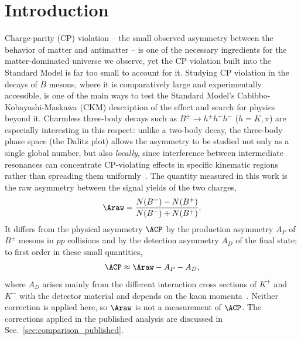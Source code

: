 \section{Introduction}
\label{sec:intro}
Charge-parity (CP) violation -- the small observed asymmetry between the behavior of matter and antimatter -- is one of the necessary ingredients for the matter-dominated universe we observe, yet the CP violation built into the Standard Model is far too small to account for it. Studying CP violation in the decays of $B$ mesons, where it is comparatively large and experimentally accessible, is one of the main ways to test the Standard Model's Cabibbo-Kobayashi-Maskawa (CKM) description of the effect and search for physics beyond it. Charmless three-body decays such as $B^{\pm}\to h^{\pm}h^{+}h^{-}$ ($h=K,\pi$) are especially interesting in this respect: unlike a two-body decay, the three-body phase space (the Dalitz plot) allows the asymmetry to be studied not only as a single global number, but also \emph{locally}, since interference between intermediate resonances can concentrate CP-violating effects in specific kinematic regions rather than spreading them uniformly~\cite{lhcb_cpv_prd2023,lhcb_cpv_paper}.
The quantity measured in this work is the raw asymmetry between the signal yields of the two charges,
\begin{equation}
\Araw=\frac{N(B^-)-N(B^+)}{N(B^-)+N(B^+)} .
\label{eq:araw}
\end{equation}
It differs from the physical asymmetry $\ACP$ by the production asymmetry $A_P$ of $B^\pm$ mesons in $pp$ collisions and by the detection asymmetry $A_D$ of the final state; to first order in these small quantities,
\begin{equation}
\ACP\approx\Araw-A_P-A_D ,
\label{eq:acp}
\end{equation}
where $A_D$ arises mainly from the different interaction cross sections of $K^+$ and $K^-$ with the detector material and depends on the kaon momenta~\cite{lhcb_cpv_prd2023}. Neither correction is applied here, so $\Araw$ is not a measurement of $\ACP$. The corrections applied in the published analysis are discussed in Sec.~\ref{sec:comparison_published}.
